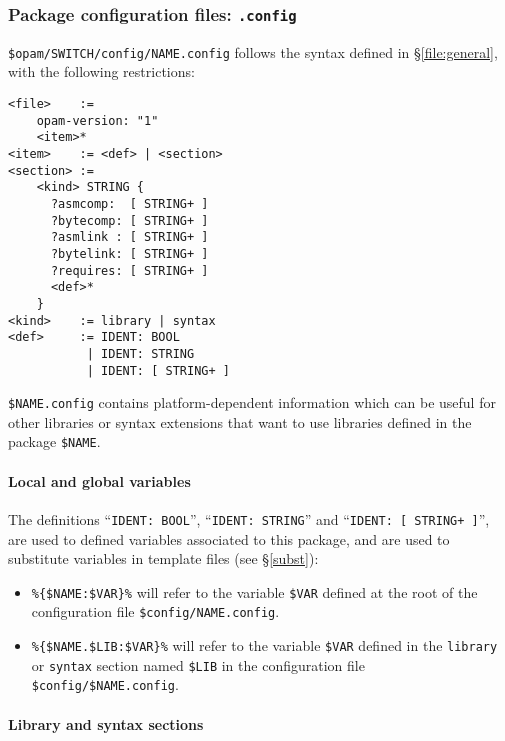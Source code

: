 \documentclass[a4paper,11pt]{article}
\begin{document}
\subsubsection{Package configuration files: {\tt *.config}}
\label{file:dotconfig}

\verb+$opam/SWITCH/config/NAME.config+ follows the syntax defined in
\S\ref{file:general}, with the following restrictions:

{\small
\begin{Verbatim}[frame=single]
<file>    :=
    opam-version: "1"
    <item>*
<item>    := <def> | <section>
<section> :=
    <kind> STRING {
      ?asmcomp:  [ STRING+ ]
      ?bytecomp: [ STRING+ ]
      ?asmlink : [ STRING+ ]
      ?bytelink: [ STRING+ ]
      ?requires: [ STRING+ ]
      <def>*
    }
<kind>    := library | syntax
<def>     := IDENT: BOOL
           | IDENT: STRING
           | IDENT: [ STRING+ ]
\end{Verbatim}
}

\verb+$NAME.config+ contains platform-dependent information which can
be useful for other libraries or syntax extensions that want to use
libraries defined in the package \verb+$NAME+.

\paragraph{Local and global variables}

The definitions ``{\tt IDENT: BOOL}'', ``{\tt IDENT: STRING}'' and ``{\tt IDENT:
  [ STRING+ ]}'', are used to defined variables associated to this
package, and are used to substitute variables in template files (see
\S\ref{subst}):

\begin{itemize}

\item \verb+%{$NAME:$VAR}%+ will refer to the variable \verb+$VAR+
  defined at the root of the configuration file \verb+$config/NAME.config+.

\item \verb+%{$NAME.$LIB:$VAR}%+ will refer to the variable \verb+$VAR+
  defined in the {\tt library} or {\tt syntax} section named
  \verb+$LIB+ in the configuration file \verb+$config/$NAME.config+.

\end{itemize}

\paragraph{Library and syntax sections}
\end{document}
